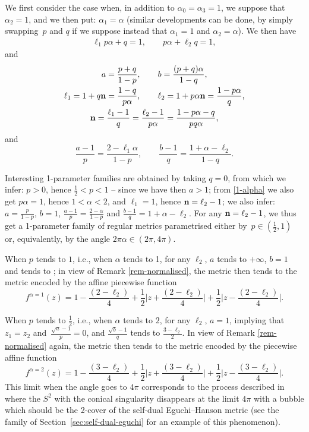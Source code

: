 \documentclass[10pt,a4paper]{amsart}
\numberwithin{equation}{section}
\begin{document}
\begin{pc} \label{pc-alpha-032} We first consider the case when, in addition to $\alpha _0 = \alpha _3 = 1$, we suppose that $\alpha _2 = 1$, and we then put: $\alpha _1 = \alpha$ (similar developments can be done, by simply swapping~$p$ and $q$ if we suppose instead that $\alpha _1 = 1$ and $\alpha _2 = \alpha$). We then have
\begin{gather} \label{1-alpha} \ell _1 p \alpha + q = 1, \qquad p \alpha + \ell _2 q = 1, \end{gather}
and
\begin{gather*} a = \frac{p + q}{1 - p}, \qquad b = \frac{(p + q) \alpha}{1 - q},\\
\ell _1 = 1 + q {\bf n} = \frac{1 - q}{p \alpha}, \qquad \ell _2 = 1 + p \alpha {\bf n} = \frac{1 - p \alpha}{q},\\
 {\bf n} = \frac{\ell _1 - 1}{q} = \frac{\ell _2 - 1}{p \alpha} = \frac{1 - p \alpha - q}{p q \alpha}, \end{gather*}
and
\[\frac{a - 1}{p} = \frac{2 - \ell _1 \alpha}{1 - p}, \qquad \frac{b - 1}{q} = \frac{1 + \alpha - \ell _2}{1 - q}. \]
 \end{pc}

Interesting 1-parameter families are obtained by taking $q = 0$, from which we infer: $p > 0$, hence $\frac{1}{2} < p < 1$ -- since we have then $a > 1$; from \eqref{1-alpha} we also get $p \alpha = 1$, hence $1 < \alpha < 2$, and $\ell _1 = 1$, hence ${\bf n} = \ell _2 - 1$; we also infer: $a = \frac{p}{1 - p}$, $b = 1$, $\frac{a - 1}{p} = \frac{2 - \alpha}{1 - p}$ and $\frac{b - 1}{q} = 1 + \alpha - \ell_2$. For any ${\bf n} = \ell _2 - 1$, we thus get a 1-parameter family of regular metrics parametrised either by~$p \in (\frac{1}{2}, 1)$ or, equivalently, by the angle $2\pi\alpha \in (2\pi, 4\pi)$.

When $p$ tends to $1$, i.e., when $\alpha$ tends to 1, for any $\ell _2$, $a$ tends to $+ \infty$, $b = 1$ and  tends to ; in view of Remark \ref{rem-normalised}, the metric then tends to the metric encoded by the affine piecewise function
\[
f ^{\alpha = 1} (z) = 1 - \frac{(2 - \ell _2)}{4} + \frac{1}{2} \Big|z + \frac{(2 - \ell _2)}{4}\Big| + \frac{1}{2} \Big|z - \frac{(2 - \ell _2)}{4}\Big|. \]

When $p$ tends to $\frac{1}{2}$, i.e., when $\alpha$ tends to $2$, for any $\ell _2$, $a = 1$, implying that $z _1 = z _2$ and~$\frac{\sqrt{a} - 1}{p} = 0$, and $\frac{\sqrt{b} - 1}{q}$ tends to $\frac{3 - \ell _2}{2}$. In view of Remark \ref{rem-normalised} again, the metric then tends to the metric encoded by the piecewise affine function
\[%
 f ^{\alpha = 2} (z) = 1 - \frac{(3 - \ell _2)}{4} + \frac{1}{2} \Big|z + \frac{(3 - \ell _2)}{4}\Big| + \frac{1}{2} \Big|z - \frac{(3 - \ell _2)}{4}\Big|. \]
This limit when the angle goes to $4\pi$ corresponds to the process described in \cite[Section~9]{BG} where the $S^2$ with the conical singularity disappears at the limit $4\pi$ with a bubble which should be the 2-cover of the self-dual Eguchi--Hanson metric (see the family of Section~\ref{sec:self-dual-eguchi} for an example of this phenomenon).
\end{document}
